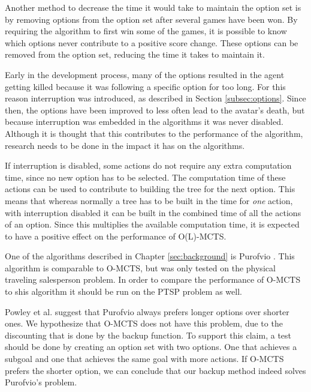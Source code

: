 Another method to decrease the time it would take to maintain the option set is
by removing options from the option set after several games have been won.
By requiring the algorithm to first win some of the games, it is possible to
know which options never contribute to a positive score change. These options
can be removed from the option set, reducing the time it takes to maintain it.

Early in the development process, many of the options resulted in the agent
getting killed because it was following a specific option for too long. For this
reason interruption was introduced, as described in Section
\ref{subsec:options}. Since then, the options have been improved to less often
lead to the avatar's death, but because interruption was embedded in the
algorithms it was never disabled.  Although it is thought that this contributes
to the performance of the algorithm, research needs to be done in the impact it
has on the algorithms.

If interruption is disabled, some actions do not require any extra computation
time, since no new option has to be selected. The computation time of these
actions can be used to contribute to building the tree for the next option. This
means that whereas normally a tree has to be built in the time for \emph{one}
action, with interruption disabled it can be built in the combined time of all
the actions of an option. Since this multiplies the available computation time,
it is expected to have a positive effect on the performance of O(L)-MCTS.

One of the algorithms described in Chapter \ref{sec:background} is Purofvio
\cite{powley2012monte}.  This algorithm is comparable to O-MCTS, but was only
tested on the physical traveling salesperson problem. In order to compare the
performance of O-MCTS to shis algorithm it should be run on the PTSP problem as
well.

Powley et al. suggest that Purofvio always prefers longer options over shorter
ones. We hypothesize that O-MCTS does not have this problem, due to the
discounting that is done by the backup function.  To support this claim, a test
should be done by creating an option set with two options.  One that achieves a
subgoal and one that achieves the same goal with more actions. If O-MCTS prefers
the shorter option, we can conclude that our backup method indeed solves Purofvio's
problem.

